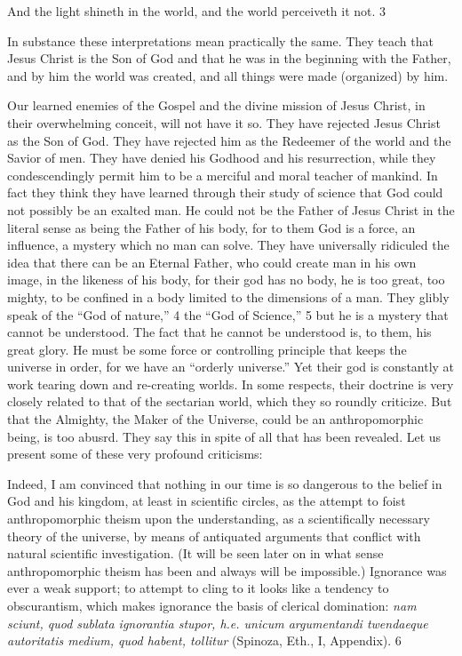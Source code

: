 And the light shineth in the world, and the world perceiveth it not. 3

In substance these interpretations mean practically the same. They teach that Jesus Christ is
the Son of God and that he was in the beginning with the Father, and by him the world was
created, and all things were made (organized) by him.

Our learned enemies of the Gospel and the divine mission of Jesus Christ, in their
overwhelming conceit, will not have it so. They have rejected Jesus Christ as the Son of God.
They have rejected him as the Redeemer of the world and the Savior of men. They have
denied his Godhood and his resurrection, while they condescendingly permit him to be a
merciful and moral teacher of mankind. In fact they think they have learned through their
study of science that God could not possibly be an exalted man. He could not be the Father of
Jesus Christ in the literal sense as being the Father of his body, for to them God is a force, an
influence, a mystery which no man can solve. They have universally ridiculed the idea that
there can be an Eternal Father, who could create man in his own image, in the likeness of his
body, for their god has no body, he is too great, too mighty, to be confined in a body limited
to the dimensions of a man. They glibly speak of the ``God of nature,'' 4 the ``God of
Science,'' 5 but he is a mystery that cannot be understood. The fact that he cannot be
understood is, to them, his great glory. He must be some force or controlling principle that
keeps the universe in order, for we have an ``orderly universe.'' Yet their god is constantly at
work tearing down and re-creating worlds. In some respects, their doctrine is very closely
related to that of the sectarian world, which they so roundly criticize. But that the Almighty,
the Maker of the Universe, could be an anthropomorphic being, is too abusrd. They say this
in spite of all that has been revealed. Let us present some of these very profound criticisms:

Indeed, I am convinced that nothing in our time is so dangerous to the belief in God and his
kingdom, at least in scientific circles, as the attempt to foist anthropomorphic theism upon
the understanding, as a scientifically necessary theory of the universe, by means of
antiquated arguments that conflict with natural scientific investigation. (It will be seen later
on in what sense anthropomorphic theism has been and always will be impossible.)
Ignorance was ever a weak support; to attempt to cling to it looks like a tendency to
obscurantism, which makes ignorance the basis of clerical domination: \textit{nam sciunt, quod
sublata ignorantia stupor, h.e. unicum argumentandi twendaeque autoritatis medium, quod
habent, tollitur} (Spinoza, Eth., I, Appendix). 6

